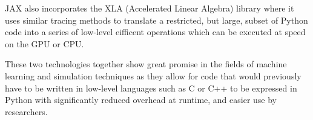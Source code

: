 JAX also incorporates the XLA (Accelerated Linear Algebra) library \cite{openxla-xla} where it uses similar tracing methods to translate a restricted, but large, subset of Python code into a series of low-level eifficent operations which can be executed at speed on the GPU or CPU.

These two technologies together show great promise in the fields of machine learning and simulation techniques as they allow for code that would previously have to be written in low-level languages such as C or C++ to be expressed in Python with significantly reduced overhead at runtime, and easier use by researchers.
